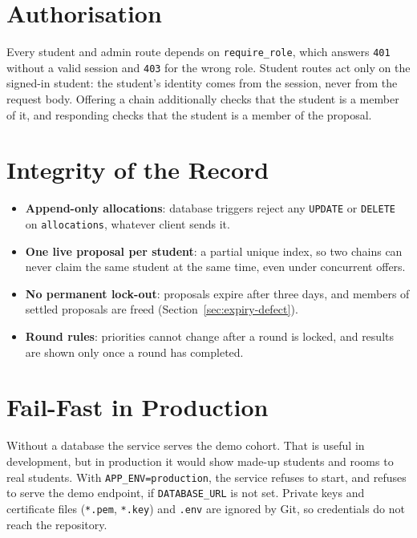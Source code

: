 \section{Authorisation}

Every student and admin route depends on \texttt{require\_role}, which
answers \texttt{401} without a valid session and \texttt{403} for the
wrong role. Student routes act only on the signed-in student: the
student's identity comes from the session, never from the request body.
Offering a chain additionally checks that the student is a member of it,
and responding checks that the student is a member of the proposal.

\section{Integrity of the Record}

\begin{itemize}
  \item \textbf{Append-only allocations}: database triggers reject any
  \texttt{UPDATE} or \texttt{DELETE} on \texttt{allocations}, whatever
  client sends it.
  \item \textbf{One live proposal per student}: a partial unique index,
  so two chains can never claim the same student at the same time, even
  under concurrent offers.
  \item \textbf{No permanent lock-out}: proposals expire after three
  days, and members of settled proposals are freed
  (Section~\ref{sec:expiry-defect}).
  \item \textbf{Round rules}: priorities cannot change after a round is
  locked, and results are shown only once a round has completed.
\end{itemize}

\section{Fail-Fast in Production}
\label{sec:failfast}

Without a database the service serves the demo cohort. That is useful
in development, but in production it would show made-up students and
rooms to real students. With \texttt{APP\_ENV=production}, the service
refuses to start, and refuses to serve the demo endpoint, if
\texttt{DATABASE\_URL} is not set. Private keys and certificate files
(\texttt{*.pem}, \texttt{*.key}) and \texttt{.env} are ignored by Git,
so credentials do not reach the repository.

